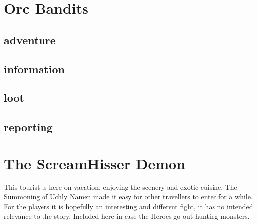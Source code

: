 \section*{Orc Bandits}


\subsection*{adventure}


\subsection*{information}


\subsection*{loot}


\subsection*{reporting}










\section*{The ScreamHisser Demon}
This tourist is here on vacation, enjoying the scenery and exotic cuisine. The Summoning of Uchly Namen made it easy for other travellers to enter for a while.
For the players it is hopefully an interesting and different fight, it has no intended relevance to the story. Included here in case the Heroes go out hunting monsters.


